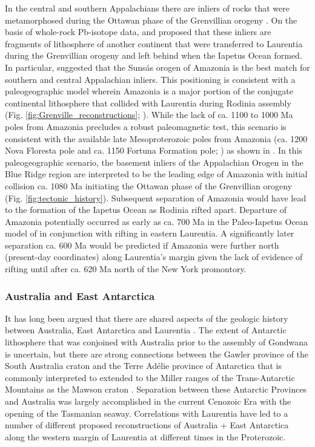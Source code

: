 \documentclass[twocolumn, switch]{article} %
\begin{document}
In the central and southern Appalachians there are inliers of rocks that were metamorphosed during the Ottawan phase of the Grenvillian orogeny \citep{McLelland2013a}. On the basis of whole-rock Pb-isotope data, \cite{Loewy2003a} and \cite{Fisher2010a} proposed that these inliers are fragments of lithosphere of another continent that were transferred to Laurentia during the Grenvillian orogeny and left behind when the Iapetus Ocean formed. In particular, \cite{Fisher2010a} suggested that the Suns\'as orogen of Amazonia is the best match for southern and central Appalachian inliers. This positioning is consistent with a paleogeographic model wherein Amazonia is a major portion of the conjugate continental lithosphere that collided with Laurentia during Rodinia assembly (Fig. \ref{fig:Grenville_reconstructions}; \citealp{Hoffman1991a, Evans2013b, Cawood2017a}). While the lack of ca. 1100 to 1000 Ma poles from Amazonia precludes a robust paleomagnetic test, this scenario is consistent with the available late Mesoproterozoic poles from Amazonia (ca. 1200 Nova Floresta pole and ca. 1150 Fortuna Formation pole; \citealp{DAgrella-Filho2021a}) as shown in \cite{Evans2013b}. In this paleogeographic scenario, the basement inliers of the Appalachian Orogen in the Blue Ridge region are interpreted to be the leading edge of Amazonia with initial collision ca. 1080 Ma initiating the Ottawan phase of the Grenvillian orogeny (Fig. \ref{fig:tectonic_history}). Subsequent separation of Amazonia would have lead to the formation of the Iapetus Ocean as Rodinia rifted apart. Departure of Amazonia potentially occurred as early as ca. 700 Ma in the Paleo-Iapetus Ocean model of  \citet{Robert2020a} in conjunction with rifting in eastern Laurentia. A significantly later separation ca. 600 Ma would be predicted if Amazonia were further north (present-day coordinates) along Laurentia's margin given the lack of evidence of rifting until after ca. 620 Ma north of the New York promontory.

\subsubsection{Australia and East Antarctica}

It has long been argued that there are shared aspects of the geologic history between Australia, East Antarctica and Laurentia \citep{Moores1991a}. The extent of Antarctic lithosphere that was conjoined with Australia prior to the assembly of Gondwana is uncertain, but there are strong connections between the Gawler province of the South Australia craton and the Terre Ad\'elie province of Antarctica that is commonly interpreted to extended to the Miller ranges of the Trans-Antarctic Mountains as the Mawson craton \citep{Payne2009b}.  Separation between these Antarctic Provinces and Australia was largely accomplished in the current Cenozoic Era with the opening of the Tasmanian seaway. Correlations with Laurentia have led to a number of different proposed reconstructions of Australia + East Antarctica along the western margin of Laurentia at different times in the Proterozoic.
\end{document}
